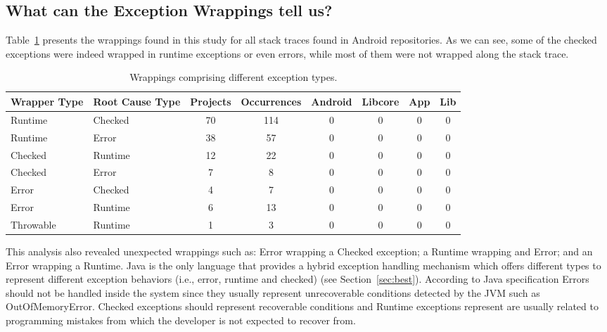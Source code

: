 \documentclass[conference]{IEEEtran}
\begin{document}
\subsection{What can the Exception Wrappings tell us?}

Table~\ref{tab:wrappingandroid} presents the wrappings found in this study for all
stack traces found in Android repositories. As we can see, some of the checked
exceptions were indeed wrapped in runtime exceptions or even errors, while most
of them were not wrapped along the stack trace. 



\begin{table}
  \centering
  \begin{tabular}{llcccccc}
    \hline
    \bfseries{Wrapper Type}  &  \bfseries{Root Cause Type} &  \bfseries{Projects}  &  \bfseries{Occurrences} & \textsf{Android} & \textsf{Libcore} & \textsf{App} & \textsf{Lib}  \\
    \hline
      Runtime &  Checked   & 70 & 114 & 0 &  0  & 0 &  0 \\
      Runtime   &  Error   & 38  & 57 & 0 &  0  & 0 &  0 \\
      Checked &  Runtime   & 12 & 22 & 0 &  0  & 0 &  0 \\
      Checked & Error      & 7 &  8 & 0 &  0  & 0 &  0 \\
      Error & Checked      & 4  &  7 & 0 &  0  & 0 &  0     \\
      Error & Runtime     & 6  &  13   & 0 &  0  & 0 &  0    \\
     Throwable & Runtime   & 1 &  3   & 0 &  0  & 0 &  0    \\
    \hline
  \end{tabular}
\caption{Wrappings comprising different exception types.}
\label{tab:wrappingandroid}
\end{table}

This analysis also revealed unexpected wrappings such as: Error wrapping a Checked 
exception; a Runtime wrapping and Error; and an Error wrapping a Runtime.
Java is the only language that provides a hybrid exception handling mechanism
which offers  different types to represent different exception behaviors (i.e., error, 
runtime and checked) (see Section~\ref{sec:best}). According to Java specification Errors should not be
handled inside the system since they usually represent unrecoverable conditions
detected by the JVM such as OutOfMemoryError. Checked exceptions should
represent recoverable conditions and  Runtime exceptions represent are usually
related to programming mistakes from which the developer is not expected to recover
from. 
\end{document}
